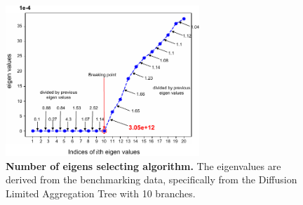 \begin{figure}[!ht]
	\centering
	\includegraphics[width=0.65\textwidth]{breakingpoint/fig}
	\vspace{0.1cm}
	\caption[Number of eigens selecting algorithm.]{\textbf{Number of eigens selecting algorithm.} The eigenvalues are derived from the benchmarking data, specifically from the Diffusion Limited Aggregation Tree with 10 branches.}
	\label{fig:breakingpoint}
\end{figure}


